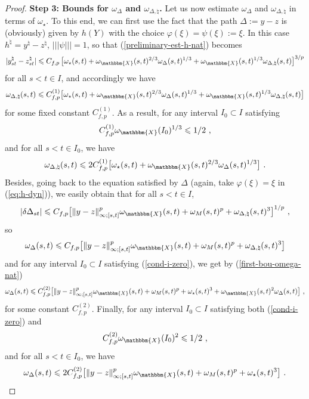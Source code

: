 \documentclass[11pt,reqno,oneside]{amsart}
\numberwithin{equation}{section}
\newcommand{\assign}{:=}
\newcommand{\tmtextbf}[1]{{\bfseries{#1}}}
\newcommand{\normtrip}[1]{|\! |\!  | #1 | \! |\!  |}
\begin{document}
\begin{proof}
  {\noindent}\tmtextbf{Step 3: Bounds for $\omega_{\Delta}$ and $\omega_{\Delta, \natural}$.} Let us now estimate $\omega_{\Delta}$ and $\omega_{\Delta, \natural}$ in terms of $\omega_{\star}$. To this end, we can first use the fact that the path $\Delta \assign y - z$ is (obviously)
  given by $h (Y)$ with the choice $\varphi (\xi) = \psi (\xi) \assign \xi$.
  In this case $h^{\natural} = y^{\natural} - z^{\natural}$, $\normtrip{\psi}=1$, so that (\ref{preliminary-est-h-nat}) becomes
  \[ | y^{\natural}_{s t} - z^{\natural}_{s t} | \leqslant C_{f,p}\,  \big[ \omega_{\star} (s, t) +\omega_{\mathbbm{X}} (s, t)^{2 / 3} \omega_{\Delta} (s, t)^{1/3}+ \omega_{\mathbbm{X}} (s, t)^{1 / 3} \omega_{\Delta,\natural} (s, t)\big]^{3 / p}  \]
for all $s<t\in I$, and accordingly we have
	\[ \omega_{\Delta,\natural} (s, t) \leqslant C_{f,p}^{(1)}\big[ \omega_{\star} (s, t) +\omega_{\mathbbm{X}} (s, t)^{2 / 3} \omega_{\Delta} (s, t)^{1/3}+ \omega_{\mathbbm{X}} (s, t)^{1 / 3} \omega_{\Delta,\natural} (s, t)\big] \]
	for some fixed constant $C_{f,p}^{(1)}$. As a result, for any interval $I_0\subset I$ satisfying 
	\begin{equation}\label{cond-i-zero}
	C_{f,p}^{(1)}\omega_{\mathbbm{X}} (I_0)^{1 / 3} \leqslant 1/2 \ ,
	\end{equation}
	and for all $s<t\in I_0$, we have
	\begin{equation}\label{first-bou-omega-nat}
 \omega_{\Delta,\natural} (s, t) \leqslant 2C_{f,p}^{(1)}\big[ \omega_{\star} (s, t) +\omega_{\mathbbm{X}} (s, t)^{2 / 3} \omega_{\Delta} (s, t)^{1/3} \big] \ .
\end{equation}
	Besides, going back to the equation satisfied by $\Delta$ (again, take $\varphi(\xi)=\xi$ in (\ref{eq:h-dyn})), we easily obtain that for all $s<t\in I$,
	$$|\delta \Delta_{st}| \leqslant C_{f,p} \big[ \|y-z\|_{\infty;[s,t]}^p \omega_{\mathbbm{X}}(s,t)+\omega_M(s,t)^p+\omega_{\Delta,\natural}(s,t)^3 \big]^{1/p} \ ,$$
so
$$\omega_\Delta(s,t)\leqslant C_{f,p} \big[  \|y-z\|_{\infty;[s,t]}^p \omega_{\mathbbm{X}}(s,t)+\omega_M(s,t)^p+\omega_{\Delta,\natural}(s,t)^3\big]$$
and for any interval $I_0\subset I$ satisfying (\ref{cond-i-zero}), we get by (\ref{first-bou-omega-nat})
$$
\omega_\Delta(s,t)\leqslant C_{f,p}^{(2)}\big[  \|y-z\|_{\infty;[s,t]}^p \omega_{\mathbbm{X}}(s,t)+\omega_M(s,t)^p+\omega_{\star}(s,t)^3+\omega_{\mathbbm{X}} (s, t)^{2} \omega_{\Delta} (s, t)\big]\ ,
$$
for some constant $C_{f,p}^{(2)}$. Finally, for any interval $I_0\subset I$ satisfying both (\ref{cond-i-zero}) and
\begin{equation}\label{cond-i-zero-two}
C_{f,p}^{(2)}\omega_{\mathbbm{X}} (I_0)^{2} \leqslant 1/2 \ ,
\end{equation} 
and for all $s<t\in I_0$, we have
\begin{equation}\label{boun-omega-delta}
\omega_\Delta(s,t)\leqslant 2C_{f,p}^{(2)}\big[  \|y-z\|_{\infty;[s,t]}^p \omega_{\mathbbm{X}}(s,t)+\omega_M(s,t)^p+\omega_{\star}(s,t)^3\big] \ .
\end{equation}
		

\end{proof}
\end{document}

